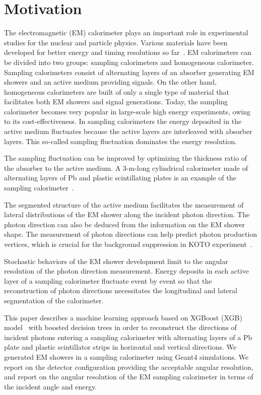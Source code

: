 \documentclass[preprint,12pt,times,a4paper]{elsarticle}
\begin{document}
\section{Motivation}
\label{sec:mot}
The electromagnetic (EM) calorimeter plays an important role in experimental studies for the nuclear and particle physics. Various materials have been developed for better energy and timing resolutions so far~\cite{Calorimeter}. EM calorimeters can be divided into two groups: sampling calorimeters and homogeneous calorimeter. Sampling calorimeters consist of alternating layers of an absorber generating EM showers and an active medium providing signals. On the other hand, homogeneous calorimeters are built of only a single type of material that facilitates both EM showers and signal generations. Today, the sampling calorimeter becomes very popular in large-scale high energy experiments, owing to its cost-effectiveness. In sampling calorimeters the energy deposited in the active medium fluctuates because the active layers are interleaved with absorber layers. This so-called sampling fluctuation dominates the energy resolution.

The sampling fluctuation can be improved by optimizing the thickness ratio of the absorber to the active medium. A 3-m-long cylindrical calorimeter made of alternating layers of Pb and plastic scintillating plates is an example of the sampling calorimeter~\cite{Murayama:2020mcp}.

The segmented structure of the active medium facilitates the measurement of lateral distributions of the EM shower along the incident photon direction. The photon direction can also be deduced from the information on the EM shower shape. The measurement of photon directions can help predict photon production vertices, which is crucial for the background suppression in KOTO experiment~\cite{KOTO:2012}.

Stochastic behaviors of the EM shower development limit to the angular resolution of the photon direction measurement. Energy deposits in each active layer of a sampling calorimeter fluctuate event by event so that the reconstruction of photon directions necessitates the longitudinal and lateral segmentation of the calorimeter.

This paper describes a machine learning approach based on XGBoost (XGB) model~\cite{xgboost:2016} with boosted decision trees in order to reconstruct the directions of incident photons entering a sampling calorimeter with alternating layers of a Pb plate and plastic scintillator strips in horizontal and vertical directions. We generated EM showers in a sampling calorimeter using Geant4 simulations. We report on the detector configuration providing the acceptable angular resolution, and report on the angular resolution of the EM sampling calorimeter in terms of the incident angle and energy.
\end{document}

